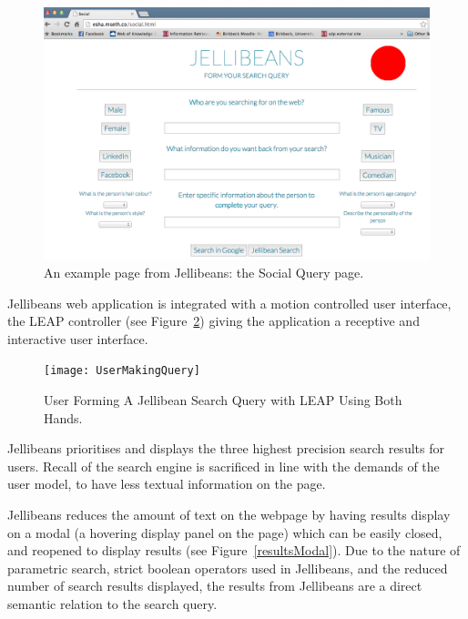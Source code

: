 \documentclass[a4paper, 11pt]{article}
\begin{document}
\begin{figure}[H]
\begin{center}
\includegraphics[scale=0.25]{SocialPage}
\end{center}
\caption{An example page from Jellibeans: the Social Query page.}
\label{SocialPage}
\end{figure}


Jellibeans web application is integrated with a motion controlled user interface, the LEAP controller (see Figure~\ref{UserMakingQuery}) giving the application a receptive and interactive user interface.

\begin{figure}[H]
\begin{center}
\texttt{[image: UserMakingQuery]}
\caption{User Forming A Jellibean Search Query with LEAP Using Both Hands.}
\label{UserMakingQuery}
\end{center}
\end{figure}

Jellibeans prioritises and displays the three highest precision search results for users. Recall of the search engine is sacrificed in line with the demands of the user model, to have less textual information on the page.

\vspace{5mm}
Jellibeans reduces the amount of text on the webpage by having results display on a modal (a hovering display panel on the page) which can be easily closed, and reopened to display results (see Figure~\ref{resultsModal}). Due to the nature of parametric search, strict boolean operators used in Jellibeans, and the reduced number of search results displayed, the results from Jellibeans are a direct semantic relation to the search query. 
\end{document}
